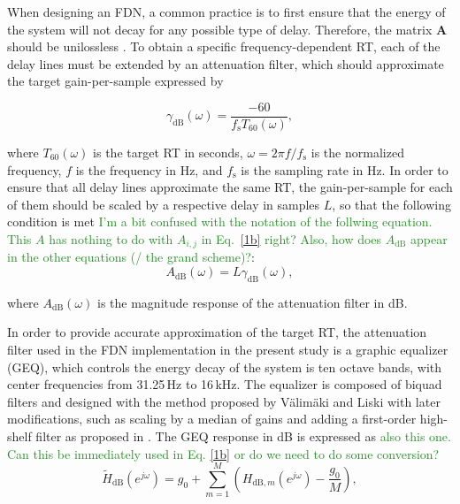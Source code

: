 \documentclass[twoside,a4paper]{article}
\newcommand{\silvin}[1]{\textcolor{ForestGreen}{#1}}
\begin{document}
When designing an FDN, a common practice is to first ensure that the energy of the system will not decay for any possible type of delay. Therefore, the matrix $\textbf{A}$ should be unilossless \cite{Schelcht:Habets:2017:IEEE:lossless:FDN}. To obtain a specific frequency-dependent RT, each of the delay lines must be extended by an attenuation filter, which should approximate the target gain-per-sample expressed by

\begin{equation}
	\gamma_\textrm{dB}(\omega)=\frac{-60}{f_\textrm{s} T_{60} (\omega)},
	\label{eq:gamma}
\end{equation}

\noindent where $T_{60}(\omega)$ is the target RT in seconds, $\omega = 2\pi f/f_\textrm{s}$ is the normalized frequency, $f$ is the frequency in Hz, and $f_\textrm{s}$ is the sampling rate in Hz. In order to ensure that all delay lines approximate the same RT, the gain-per-sample for each of them should be scaled by a respective delay in samples $L$, so that the following condition is met \silvin{I'm a bit confused with the notation of the follwing equation. This $A$ has nothing to do with $A_{i,j}$ in Eq.~\eqref{1b} right? Also, how does $A_\text{dB}$ appear in the other equations (/ the grand scheme)?}: 
\begin{equation}
	A_\textrm{dB}(\omega)=L\gamma_\textrm{dB}(\omega),
	\label{eq:attenuation}
\end{equation}

\noindent where $A_\textrm{dB}(\omega)$ is the magnitude response of the attenuation filter in dB.



In order to provide accurate approximation of the target RT, the attenuation filter used in the FDN implementation in the present study is a graphic equalizer (GEQ), which controls the energy decay of the system is ten octave bands, with center frequencies from 31.25\,Hz to 16\,kHz. The equalizer is composed of biquad filters \cite{Orfanidis:2010:introduction:SP} and designed with the method proposed by V\"alim\"aki and Liski \cite{Valimaki:Liski:2017:IEEE:accurate:equalizer} with later modifications, such as scaling by a median of gains and adding a first-order high-shelf filter as proposed in \cite{prawda:2019:improved}. The GEQ response in dB is expressed as \silvin{also this one. Can this be immediately used in Eq. \eqref{1b} or do we need to do some conversion?}
\begin{equation}
    \widetilde{H}_\textrm{dB}(e^{j\omega}) = g_0+\sum_{m=1}^M \left(H_{\textrm{dB},m}(e^{j\omega})-\frac{g_0}{M}\right),
	\label{eq:GEQ}
\end{equation}
\end{document}

